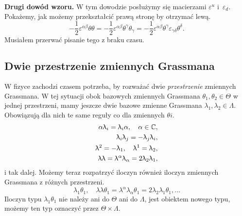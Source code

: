 \documentclass[a4paper,11pt]{article}
\begin{document}
\textbf{Drugi dowód wzoru.} W tym dowodzie posłużymy się macierzami $\varepsilon^{ u }$ i~$\varepsilon_{ d }$. Pokażemy, jak możemy przekształcić prawą stronę by otrzymać lewą.
\begin{equation}
  \label{eq:11}
  -\frac{ 1 }{ 2 } \varepsilon^{ \alpha \beta } \theta \theta
  = -\frac{ 1 }{ 2 } \varepsilon^{ \alpha \beta } \theta^{ \gamma } \theta_{ \gamma }
  = -\frac{ 1 }{ 2 } \varepsilon^{ \alpha \beta } \theta^{ \gamma } \varepsilon_{ \gamma \delta } \theta^{ \delta }.
\end{equation}
Musiałem przerwać pisanie tego z braku czasu.





\subsection{Dwie przestrzenie zmiennych Grassmana}


W fizyce zachodzi czasem potrzeba, by rozważać dwie \textit{przestrzenie} zmiennych Grassmana. W tej sytuacji obok bazowych zmiennych Grassmana $\theta_{ 1 }, \theta_{ 2 } \in \Theta$ w jednej przestrzeni, mamy jeszcze dwie bazowe zmienne Grassmana $\lambda_{ 1 }, \lambda_{ 2 } \in \Lambda$. Obowiązują dla nich te same reguły co dla zmiennych $\theta{ i }$.
\begin{subequations}
  \begin{align}
    \alpha \uplambda_{ i } = \uplambda_{ i } \alpha, \quad \alpha \in \mathbb{C}, \\
    \uplambda_{ i } \uplambda_{ j } = -\uplambda_{ j } \uplambda_{ i }, \\
    \uplambda^{ 2 } = -\uplambda_{ 1 }, \quad \uplambda^{ 1 } = \uplambda_{ 2 }, \\
    \uplambda \uplambda = \uplambda^{ \alpha } \uplambda_{ \alpha } = 2 \uplambda_{ 2 } \uplambda_{ 1 },
  \end{align}
\end{subequations}
i tak dalej. Możemy teraz rozpatrzyć iloczyn również iloczyn zmiennych Grassmana z różnych przestrzeni.
\begin{equation}
  \label{eq:14}
  \lambda_{ 1 } \theta_{ 1 }, \quad \lambda \lambda \theta_{ 1 } = \lambda^{ \alpha } \lambda_{ \alpha } \theta_{ 1 }
  = 2 \lambda_{ 2 } \lambda_{ 1 } \theta_{ 1 }, \ldots
\end{equation}
Iloczyn typu $\lambda_{ 1 } \theta_{ 1 }$ nie należy ani do $\Theta$ ani do $\Lambda$, jest obiektem nowego typu, możemy ten typ oznaczyć przez $\Theta \times \Lambda$.
\end{document}
